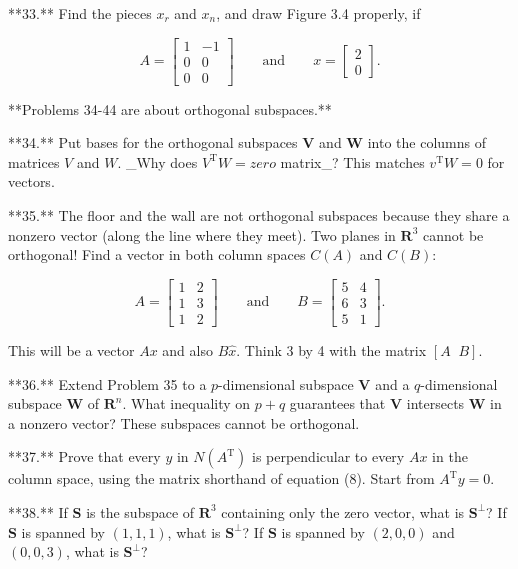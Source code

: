 

**33.** Find the pieces \(x_{r}\) and \(x_{n}\), and draw Figure 3.4 properly, if

\[A=\begin{bmatrix}1&-1\\ 0&0\\ 0&0\end{bmatrix}\qquad\text{and}\qquad x=\begin{bmatrix}2\\ 0\end{bmatrix}.\]

**Problems 34-44 are about orthogonal subspaces.**

**34.** Put bases for the orthogonal subspaces \(\mathbf{V}\) and \(\mathbf{W}\) into the columns of matrices \(V\) and \(W\). _Why does \(V^{\mathrm{T}}W=zero\) matrix_? This matches \(v^{\mathrm{T}}W=0\) for vectors.

**35.** The floor and the wall are not orthogonal subspaces because they share a nonzero vector (along the line where they meet). Two planes in \(\mathbf{R}^{3}\) cannot be orthogonal! Find a vector in both column spaces \(C(A)\) and \(C(B)\):

\[A=\begin{bmatrix}1&2\\ 1&3\\ 1&2\end{bmatrix}\qquad\text{and}\qquad B=\begin{bmatrix}5&4\\ 6&3\\ 5&1\end{bmatrix}.\]

This will be a vector \(Ax\) and also \(B\widehat{x}\). Think 3 by 4 with the matrix \([A\;\;B]\).

**36.** Extend Problem 35 to a \(p\)-dimensional subspace \(\mathbf{V}\) and a \(q\)-dimensional subspace \(\mathbf{W}\) of \(\mathbf{R}^{n}\). What inequality on \(p+q\) guarantees that \(\mathbf{V}\) intersects \(\mathbf{W}\) in a nonzero vector? These subspaces cannot be orthogonal.

**37.** Prove that every \(y\) in \(N(A^{\mathrm{T}})\) is perpendicular to every \(Ax\) in the column space, using the matrix shorthand of equation (8). Start from \(A^{\mathrm{T}}y=0\).

**38.** If \(\mathbf{S}\) is the subspace of \(\mathbf{R}^{3}\) containing only the zero vector, what is \(\mathbf{S}^{\perp}\)? If \(\mathbf{S}\) is spanned by \((1,1,1)\), what is \(\mathbf{S}^{\perp}\)? If \(\mathbf{S}\) is spanned by \((2,0,0)\) and \((0,0,3)\), what is \(\mathbf{S}^{\perp}\)?

